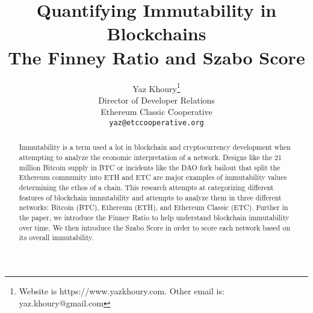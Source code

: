 \documentclass{article}
\title{
        Quantifying Immutability in Blockchains\\
        \large The Finney Ratio and Szabo Score
}
\subtitle{}
\author{
        Yaz Khoury\thanks{Website is https://www.yazkhoury.com. Other email is: yaz.khoury@gmail.com} \\
        Director of Developer Relations\\
        Ethereum Classic Cooperative\\
        \texttt{yaz@etccooperative.org} \\
}
\begin{document}
\maketitle

\begin{abstract}
Immutability is a term used a lot in blockchain and cryptocurrency development when attempting to analyze the economic interpretation of a network. Designs like the 21 million Bitcoin supply in BTC or incidents
like the DAO fork bailout that split the Ethereum community into ETH and ETC are major examples of immutability values determining the ethos of a chain. This research attempts at categorizing different features
of blockchain immutability and attempts to analyze them in three different networks: Bitcoin (BTC), Ethereum (ETH), and Ethereum Classic (ETC). Further in the paper, we introduce the Finney Ratio to help understand
blockchain immutability over time. We then introduce the Szabo Score in order to score each network based on its overall immutability.
\end{abstract}

\end{document}
